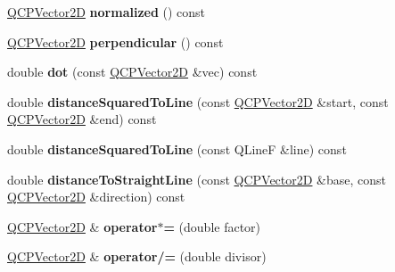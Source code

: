 \begin{DoxyCompactItemize}
\item 
\hyperlink{class_q_c_p_vector2_d}{Q\+C\+P\+Vector2D} {\bfseries normalized} () const \hypertarget{class_q_c_p_vector2_d_a98087a9a89eed142185c8b5d04309ad3}{}\label{class_q_c_p_vector2_d_a98087a9a89eed142185c8b5d04309ad3}

\item 
\hyperlink{class_q_c_p_vector2_d}{Q\+C\+P\+Vector2D} {\bfseries perpendicular} () const \hypertarget{class_q_c_p_vector2_d_a4cdadb1cda3c522a5c14c3f92db78b2a}{}\label{class_q_c_p_vector2_d_a4cdadb1cda3c522a5c14c3f92db78b2a}

\item 
double {\bfseries dot} (const \hyperlink{class_q_c_p_vector2_d}{Q\+C\+P\+Vector2D} \&vec) const \hypertarget{class_q_c_p_vector2_d_a2decf61d2230103055830ba749e72ed2}{}\label{class_q_c_p_vector2_d_a2decf61d2230103055830ba749e72ed2}

\item 
double {\bfseries distance\+Squared\+To\+Line} (const \hyperlink{class_q_c_p_vector2_d}{Q\+C\+P\+Vector2D} \&start, const \hyperlink{class_q_c_p_vector2_d}{Q\+C\+P\+Vector2D} \&end) const \hypertarget{class_q_c_p_vector2_d_a0f85a9c351640a4e0fc3c2a1a42d5d0c}{}\label{class_q_c_p_vector2_d_a0f85a9c351640a4e0fc3c2a1a42d5d0c}

\item 
double {\bfseries distance\+Squared\+To\+Line} (const Q\+LineF \&line) const \hypertarget{class_q_c_p_vector2_d_a465aa1d96ae076bf33a7ec6cc49722be}{}\label{class_q_c_p_vector2_d_a465aa1d96ae076bf33a7ec6cc49722be}

\item 
double {\bfseries distance\+To\+Straight\+Line} (const \hyperlink{class_q_c_p_vector2_d}{Q\+C\+P\+Vector2D} \&base, const \hyperlink{class_q_c_p_vector2_d}{Q\+C\+P\+Vector2D} \&direction) const \hypertarget{class_q_c_p_vector2_d_a29e8472875754769397f0d47d727be41}{}\label{class_q_c_p_vector2_d_a29e8472875754769397f0d47d727be41}

\item 
\hyperlink{class_q_c_p_vector2_d}{Q\+C\+P\+Vector2D} \& {\bfseries operator$\ast$=} (double factor)\hypertarget{class_q_c_p_vector2_d_a40c5c7c1b3e613936e7cd2d0e132e0db}{}\label{class_q_c_p_vector2_d_a40c5c7c1b3e613936e7cd2d0e132e0db}

\item 
\hyperlink{class_q_c_p_vector2_d}{Q\+C\+P\+Vector2D} \& {\bfseries operator/=} (double divisor)\hypertarget{class_q_c_p_vector2_d_a1540d17102cb4e26d4af2c58c5ce6807}{}\label{class_q_c_p_vector2_d_a1540d17102cb4e26d4af2c58c5ce6807}


\end{DoxyCompactItemize}
